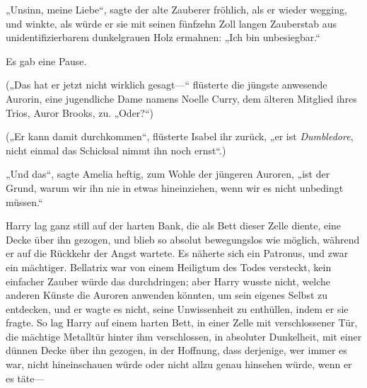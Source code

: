 „Unsinn, meine Liebe“, sagte der alte Zauberer fröhlich, als er wieder wegging, und winkte, als würde er sie mit seinen fünfzehn Zoll langen Zauberstab aus unidentifizierbarem dunkelgrauen Holz ermahnen:
„Ich bin unbesiegbar.“

Es gab eine Pause.

(„Das hat er jetzt nicht wirklich gesagt—“ flüsterte die jüngste anwesende Aurorin, eine jugendliche Dame namens Noelle Curry, dem älteren Mitglied ihres Trios, Auror Brooks, zu.
„Oder?“)

(„Er kann damit durchkommen“, flüsterte Isabel ihr zurück, „er ist \emph{Dumbledore}, nicht einmal das Schicksal nimmt ihn noch ernst“.)

„Und das“, sagte Amelia heftig, zum Wohle der jüngeren Auroren, „ist der Grund, warum wir ihn nie in etwas hineinziehen, wenn wir es nicht unbedingt müssen.“

\later

Harry lag ganz still auf der harten Bank, die als Bett dieser Zelle diente, eine Decke über ihn gezogen, und blieb so absolut bewegungslos wie möglich, während er auf die Rückkehr der Angst wartete. Es näherte sich ein Patronus, und zwar ein mächtiger. Bellatrix war von einem Heiligtum des Todes versteckt, kein einfacher Zauber würde das durchdringen; aber Harry wusste nicht, welche anderen Künste die Auroren anwenden könnten, um sein eigenes Selbst zu entdecken, und er wagte es nicht, seine Unwissenheit zu enthüllen, indem er sie fragte. So lag Harry auf einem harten Bett, in einer Zelle mit verschlossener Tür, die mächtige Metalltür hinter ihm verschlossen, in absoluter Dunkelheit, mit einer dünnen Decke über ihn gezogen, in der Hoffnung, dass derjenige, wer immer es war, nicht hineinschauen würde oder nicht allzu genau hinsehen würde, wenn er es täte—

